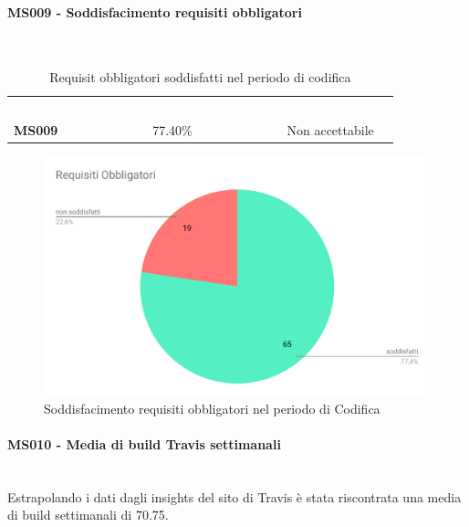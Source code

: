 \paragraph{MS009 - Soddisfacimento requisiti obbligatori}\mbox{}\\[0,3cm]
    \begin{table}[H]
        \centering
        \begin{tabular}{cccc}
        \rowcolor{greySWEight}
        \textcolor{white}{\textbf{Codice}} &
        \textcolor{white}{\textbf{Requisiti obbligatori soddisfatti}} &
        \textcolor{white}{\textbf{Riscontro}}\\
        \textbf{MS009}& 77.40\% & \textcolor{BrickRed}{Non accettabile} \\

        \end{tabular}
        \caption{Requisit obbligatori soddisfatti nel periodo di codifica}
    \end{table}
    \begin{figure}[H]
        \centering
        \includegraphics[width=0.7\linewidth]{sez/App_Esito/Qualifica/graph/RequisitiObbligatori.pdf}
        \caption{Soddisfacimento requisiti obbligatori nel periodo di Codifica}
    \end{figure}

\paragraph{MS010 - Media di build Travis settimanali}\mbox{}\\[0,3cm]
    Estrapolando i dati dagli insights del sito di Travis è stata riscontrata una media di build settimanali di 70.75.

